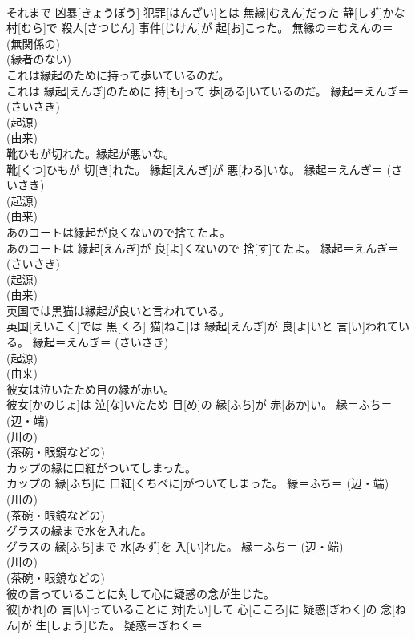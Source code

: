 \documentclass[8pt]{extreport}
\begin{document}
\begin{CJK}{UTF8}{min}
{\\	それまで 凶暴[きょうぼう] 犯罪[はんざい]とは 無縁[むえん]だった 静[しず]かな 村[むら]で 殺人[さつじん] 事件[じけん]が 起[お]こった。	無縁の＝むえんの＝ (無関係の) 
\\	(縁者のない) 
\\	これは縁起のために持って歩いているのだ。	
\\	これは 縁起[えんぎ]のために 持[も]って 歩[ある]いているのだ。	縁起＝えんぎ＝ (さいさき) 
\\	(起源) 
\\	(由来) 
\\	靴ひもが切れた。縁起が悪いな。	
\\	靴[くつ]ひもが 切[き]れた。 縁起[えんぎ]が 悪[わる]いな。	縁起＝えんぎ＝ (さいさき) 
\\	(起源) 
\\	(由来) 
\\	あのコートは縁起が良くないので捨てたよ。	
\\	あのコートは 縁起[えんぎ]が 良[よ]くないので 捨[す]てたよ。	縁起＝えんぎ＝ (さいさき) 
\\	(起源) 
\\	(由来) 
\\	英国では黒猫は縁起が良いと言われている。	
\\	英国[えいこく]では 黒[くろ] 猫[ねこ]は 縁起[えんぎ]が 良[よ]いと 言[い]われている。	縁起＝えんぎ＝ (さいさき) 
\\	(起源) 
\\	(由来) 
\\	彼女は泣いたため目の縁が赤い。	
\\	彼女[かのじょ]は 泣[な]いたため 目[め]の 縁[ふち]が 赤[あか]い。	縁＝ふち＝ (辺・端) 
\\	(川の) 
\\	(茶碗・眼鏡などの) 
\\	カップの縁に口紅がついてしまった。	
\\	カップの 縁[ふち]に 口紅[くちべに]がついてしまった。	縁＝ふち＝ (辺・端) 
\\	(川の) 
\\	(茶碗・眼鏡などの) 
\\	グラスの縁まで水を入れた。	
\\	グラスの 縁[ふち]まで 水[みず]を 入[い]れた。	縁＝ふち＝ (辺・端) 
\\	(川の) 
\\	(茶碗・眼鏡などの) 
\\	彼の言っていることに対して心に疑惑の念が生じた。	
\\	彼[かれ]の 言[い]っていることに 対[たい]して 心[こころ]に 疑惑[ぎわく]の 念[ねん]が 生[しょう]じた。	疑惑＝ぎわく＝ 
}
\end{CJK}
\end{document}
